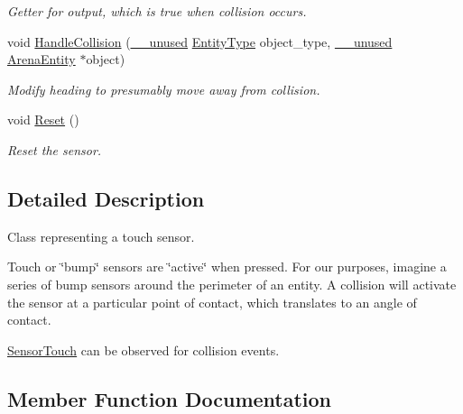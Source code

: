 \begin{DoxyCompactItemize}
\begin{DoxyCompactList}\small\item\em Getter for output, which is true when collision occurs. \end{DoxyCompactList}\item 
void \hyperlink{classSensorTouch_a1980b126f7c6d0e6bdf75f1bb59fe5c2}{Handle\+Collision} (\hyperlink{common_8h_a2e3484535ee610c8e19e9859563abe48}{\+\_\+\+\_\+unused} \hyperlink{entity__type_8h_ad79a57ed3105eb60d991a1aeb4a9dc44}{Entity\+Type} object\+\_\+type, \hyperlink{common_8h_a2e3484535ee610c8e19e9859563abe48}{\+\_\+\+\_\+unused} \hyperlink{classArenaEntity}{Arena\+Entity} $\ast$object)
\begin{DoxyCompactList}\small\item\em Modify heading to presumably move away from collision. \end{DoxyCompactList}\item 
void \hyperlink{classSensorTouch_ad0054916c97844a51052e5dee63f68b9}{Reset} ()\hypertarget{classSensorTouch_ad0054916c97844a51052e5dee63f68b9}{}\label{classSensorTouch_ad0054916c97844a51052e5dee63f68b9}

\begin{DoxyCompactList}\small\item\em Reset the sensor. \end{DoxyCompactList}\end{DoxyCompactItemize}


\subsection{Detailed Description}
Class representing a touch sensor. 

Touch or \char`\"{}bump\char`\"{} sensors are \char`\"{}active\char`\"{} when pressed. For our purposes, imagine a series of bump sensors around the perimeter of an entity. A collision will activate the sensor at a particular point of contact, which translates to an angle of contact.

\hyperlink{classSensorTouch}{Sensor\+Touch} can be observed for collision events. 

\subsection{Member Function Documentation}

